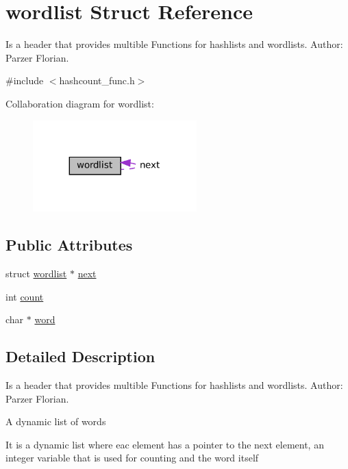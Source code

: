 \hypertarget{structwordlist}{}\section{wordlist Struct Reference}
\label{structwordlist}


Is a header that provides multible Functions for hashlists and wordlists. Author\+: Parzer Florian.  




{\ttfamily \#include $<$hashcount\+\_\+func.\+h$>$}



Collaboration diagram for wordlist\+:\nopagebreak
\begin{figure}[H]
\begin{center}
\leavevmode
\includegraphics[width=179pt]{structwordlist__coll__graph}
\end{center}
\end{figure}
\subsection*{Public Attributes}
\begin{DoxyCompactItemize}
\item 
struct \hyperlink{structwordlist}{wordlist} $\ast$ \hyperlink{structwordlist_a6a9fb0cf06d47f1bf57f0c71889cb889}{next}
\item 
int \hyperlink{structwordlist_a472cb03a36de8c3507bcf07abf56a607}{count}
\item 
char $\ast$ \hyperlink{structwordlist_adf182e526a01f9bcf7e01e869a7de1a3}{word}
\end{DoxyCompactItemize}


\subsection{Detailed Description}
Is a header that provides multible Functions for hashlists and wordlists. Author\+: Parzer Florian. 

A dynamic list of words

It is a dynamic list where eac element has a pointer to the next element, an integer variable that is used for counting and the word itself 

